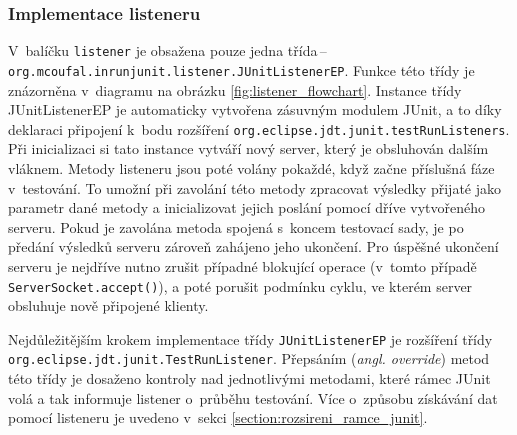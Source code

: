       \subsubsection{Implementace listeneru}
	V~balíčku \texttt{listener} je obsažena pouze jedna třída\,--\,\texttt{org.\-mcoufal.\-inrunjunit.\-listener.\-JUnitListenerEP}. Funkce této třídy je znázorněna v~diagramu na obrázku \ref{fig:listener_flowchart}. Instance třídy JUnitListenerEP je automaticky vytvořena zásuvným modulem JUnit, a to díky deklaraci připojení k~bodu rozšíření \texttt{org.\-eclipse.\-jdt.\-junit.\-testRunListeners}. Při inicializaci si tato instance vytváří nový server, který je obsluhován dalším vláknem. Metody listeneru jsou poté volány pokaždé, když začne příslušná fáze v~testování. To umožní při zavolání této metody zpracovat výsledky přijaté jako parametr dané metody a inicializovat jejich poslání pomocí dříve vytvořeného serveru. Pokud je zavolána metoda spojená s~koncem testovací sady, je po předání výsledků serveru zároveň zahájeno jeho ukončení. Pro úspěšné ukončení serveru je nejdříve nutno zrušit případné blokující operace (v~tomto případě \texttt{ServerSocket.accept()}), a poté porušit podmínku cyklu, ve kterém server obsluhuje nově připojené klienty.
	
	Nejdůležitějším krokem implementace třídy \texttt{JUnitListenerEP} je rozšíření třídy \texttt{org.\-eclipse.\-jdt.\-junit.\-TestRunListener}. Přepsáním (\emph{angl. override}) metod této třídy je dosaženo kontroly nad jednotlivými metodami, které rámec JUnit volá a tak informuje listener o~průběhu testování. Více o~způsobu získávání dat pomocí listeneru je uvedeno v~sekci \ref{section:rozsireni_ramce_junit}.
	
